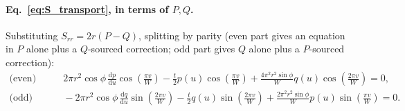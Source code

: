 \documentclass[11pt]{article}
\begin{document}
\paragraph{Eq.~\eqref{eq:S_transport}, in terms of $P,Q$.} Substituting $S_{rr}=2r(P-Q)$, splitting by parity (even part gives an equation in $P$ alone plus a $Q$-sourced correction; odd part gives $Q$ alone plus a $P$-sourced correction):
\begin{align}
    \text{(even)}&\qquad 2\pi r^2\cos\phi\,\frac{\mathrm dp}{\mathrm du}\cos\!\left(\frac{\pi v}{W}\right) - \frac t2p(u)\cos\!\left(\frac{\pi v}{W}\right) + \frac{4\pi^2r^2\sin\phi}{W}q(u)\cos\!\left(\frac{2\pi v}{W}\right) = 0, \label{eq:S_transport_PQ_even}\\
    \text{(odd)}&\qquad -2\pi r^2\cos\phi\,\frac{\mathrm dq}{\mathrm du}\sin\!\left(\frac{2\pi v}{W}\right) - \frac t2q(u)\sin\!\left(\frac{2\pi v}{W}\right) + \frac{2\pi^2r^2\sin\phi}{W}p(u)\sin\!\left(\frac{\pi v}{W}\right) = 0. \label{eq:S_transport_PQ_odd}
\end{align}
\end{document}
